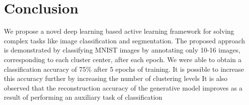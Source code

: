 \documentclass{uai2021} %
\begin{document}
\section{Conclusion} \label{conclusion}
We propose a novel deep learning based active learning framework for solving complex tasks like image classification and segmentation.
The proposed approach is demonstrated by classifying MNIST images by annotating only 10-16 images, corresponding to each cluster center,  after each epoch.
We were able to obtain a classification accuracy of 75\% after 5 epochs of training.
It is possible to increase this accuracy further by increasing the number of clustering levels
It is also observed that the reconstruction accuracy of the generative model improves as a result of performing an auxiliary task of classification
%
%
\end{document}
